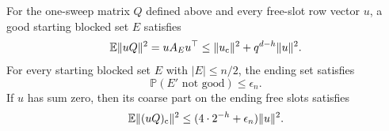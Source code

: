 \begin{lemma}\label{lem:coarse-block-estimates}
For the one-sweep matrix $Q$ defined above and every free-slot row vector $u$, a good starting blocked set $E$ satisfies
\begin{equation}
 \mathbb E\|uQ\|^2=u A_E u^\top
 \le \|u_{\rm c}\|^2+q^{d-h}\|u\|^2. \label{special:burn-active:eq:2}
\end{equation}
For every starting blocked set $E$ with $|E|\le n/2$, the ending set satisfies
\begin{equation}
 \mathbb P(E'\text{ not good})\le
 \epsilon_n. \label{special:burn-active:eq:3}
\end{equation}
If $u$ has sum zero, then its coarse part on the ending free slots satisfies
\begin{equation}
 \mathbb E\|(uQ)_{\rm c}\|^2\le (4\cdot 2^{-h}+\epsilon_n)\|u\|^2. \label{special:burn-active:eq:4}
\end{equation}
\end{lemma}
